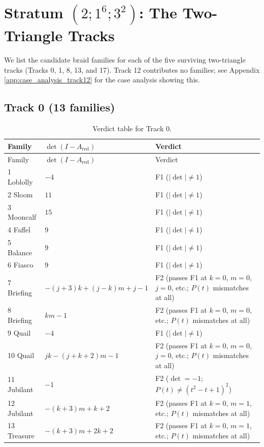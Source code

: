 \section{Stratum $(2;1^6;3^2)$: The Two-Triangle Tracks}

We list the candidate braid families for each of the five surviving two-triangle tracks (Tracks 0, 1, 8, 13, and 17). Track 12 contributes no families; see Appendix \ref{app:case_analysis_track12} for the case analysis showing this.

\subsection{Track 0 (13 families)}

\begin{longtable}{@{}l l >{\raggedright\arraybackslash}p{}@{}}
\caption{Verdict table for Track 0.}\\
\toprule
Family & $\det(I-A_{\text{red}})$ & Verdict \\
\midrule
\endfirsthead
\toprule
Family & $\det(I-A_{\text{red}})$ & Verdict \\
\midrule
\endhead
1 Loblolly & $-4$ & F1 ($|\det| \neq 1$) \\
2 Sloom & $11$ & F1 ($|\det| \neq 1$) \\
3 Mooncalf & $15$ & F1 ($|\det| \neq 1$) \\
4 Faffel & $9$ & F1 ($|\det| \neq 1$) \\
5 Balance & $9$ & F1 ($|\det| \neq 1$) \\
6 Fiasco & $9$ & F1 ($|\det| \neq 1$) \\
7 Briefing & $-(j+3)k+(j-k)m+j-1$ & F2 (passes F1 at $k = 0$, $m = 0$, $j = 0$, etc.; $P(t)$ mismatches at all) \\
8 Briefing & $km-1$ & F2 (passes F1 at $k = 0$, $m = 0$, etc.; $P(t)$ mismatches at all) \\
9 Quail & $-4$ & F1 ($|\det| \neq 1$) \\
10 Quail & $jk-(j+k+2)m-1$ & F2 (passes F1 at $k = 0$, $m = 0$, $j = 0$, etc.; $P(t)$ mismatches at all) \\
11 Jubilant & $-1$ & F2 ($\det = -1$; $P(t) \neq (t^2-t+1)^2$) \\
12 Jubilant & $-(k+3)m+k+2$ & F2 (passes F1 at $k = 0$, $m = 1$, etc.; $P(t)$ mismatches at all) \\
13 Treasure & $-(k+3)m+2k+2$ & F2 (passes F1 at $k = 0$, $m = 1$, etc.; $P(t)$ mismatches at all) \\
\bottomrule
\end{longtable}

